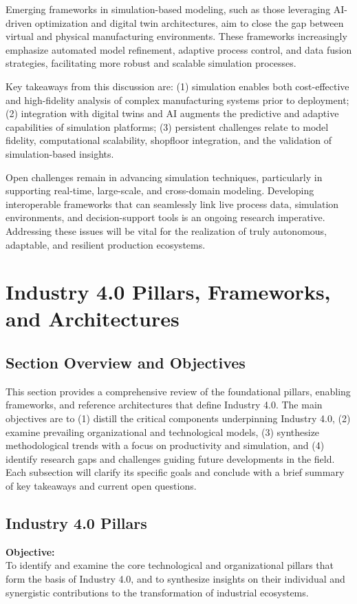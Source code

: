 \documentclass[sigconf]{acmart}
\begin{document}
Emerging frameworks in simulation-based modeling, such as those leveraging AI-driven optimization and digital twin architectures, aim to close the gap between virtual and physical manufacturing environments. These frameworks increasingly emphasize automated model refinement, adaptive process control, and data fusion strategies, facilitating more robust and scalable simulation processes.

Key takeaways from this discussion are: (1) simulation enables both cost-effective and high-fidelity analysis of complex manufacturing systems prior to deployment; (2) integration with digital twins and AI augments the predictive and adaptive capabilities of simulation platforms; (3) persistent challenges relate to model fidelity, computational scalability, shopfloor integration, and the validation of simulation-based insights.

Open challenges remain in advancing simulation techniques, particularly in supporting real-time, large-scale, and cross-domain modeling. Developing interoperable frameworks that can seamlessly link live process data, simulation environments, and decision-support tools is an ongoing research imperative. Addressing these issues will be vital for the realization of truly autonomous, adaptable, and resilient production ecosystems.

\section{Industry 4.0 Pillars, Frameworks, and Architectures}

\subsection*{Section Overview and Objectives}
This section provides a comprehensive review of the foundational pillars, enabling frameworks, and reference architectures that define Industry 4.0. The main objectives are to (1) distill the critical components underpinning Industry 4.0, (2) examine prevailing organizational and technological models, (3) synthesize methodological trends with a focus on productivity and simulation, and (4) identify research gaps and challenges guiding future developments in the field. Each subsection will clarify its specific goals and conclude with a brief summary of key takeaways and current open questions.

\subsection{Industry 4.0 Pillars}
\textbf{Objective:}\\ 
To identify and examine the core technological and organizational pillars that form the basis of Industry 4.0, and to synthesize insights on their individual and synergistic contributions to the transformation of industrial ecosystems.
\end{document}
